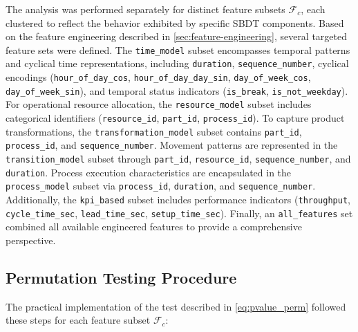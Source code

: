 The analysis was performed separately for distinct feature subsets $\mathcal{F}_c$, each clustered to reflect the behavior exhibited by specific SBDT components. Based on the feature engineering described in \autoref{sec:feature-engineering}, several targeted feature sets were defined. The \texttt{time\_model} subset encompasses temporal patterns and cyclical time representations, including \texttt{duration}, \texttt{sequence\_number}, cyclical encodings (\texttt{hour\_of\_day\_cos}, \texttt{hour\_of\_day\_day\_sin}, \texttt{day\_of\_week\_cos}, \texttt{day\_of\_week\_sin}), and temporal status indicators (\texttt{is\_break}, \texttt{is\_not\_weekday}). For operational resource allocation, the \texttt{resource\_model} subset includes categorical identifiers (\texttt{resource\_id}, \texttt{part\_id}, \texttt{process\_id}). To capture product transformations, the \texttt{transformation\_model} subset contains \texttt{part\_id}, \texttt{process\_id}, and \texttt{sequence\_number}. Movement patterns are represented in the \texttt{transition\_model} subset through \texttt{part\_id}, \texttt{resource\_id}, \texttt{sequence\_number}, and \texttt{duration}. Process execution characteristics are encapsulated in the \texttt{process\_model} subset via \texttt{process\_id}, \texttt{duration}, and \texttt{sequence\_number}. Additionally, the \texttt{kpi\_based} subset includes performance indicators (\texttt{throughput}, \texttt{cycle\_time\_sec}, \texttt{lead\_time\_sec}, \texttt{setup\_time\_sec}). Finally, an \texttt{all\_features} set combined all available engineered features to provide a comprehensive perspective.

\subsection*{Permutation Testing Procedure}

The practical implementation of the test described in \autoref{eq:pvalue_perm} followed these steps for each feature subset $\mathcal{F}_c$:

